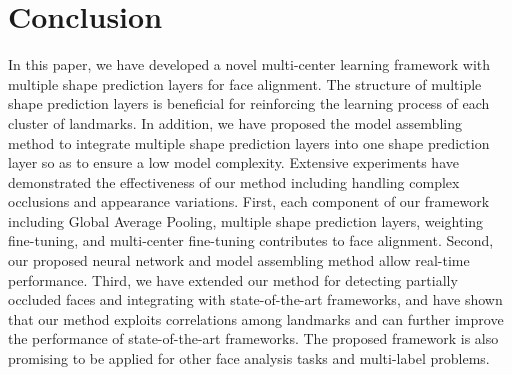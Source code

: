 \documentclass[journal]{IEEEtran}
\begin{document}
\section{Conclusion}
\label{sec:concl}

In this paper, we have developed a novel multi-center learning framework with multiple shape prediction layers for face alignment. The structure of multiple shape prediction layers is beneficial for reinforcing the learning process of each cluster of landmarks. In addition, we have proposed the model assembling method to integrate multiple shape prediction layers into one shape prediction layer so as to ensure a low model complexity. Extensive experiments have demonstrated the effectiveness of our method including handling complex occlusions and appearance variations. First, each component of our framework including Global Average Pooling, multiple shape prediction layers, weighting fine-tuning, and multi-center fine-tuning contributes to face alignment. Second, our proposed neural network and model assembling method allow real-time performance. Third, we have extended our method for detecting partially occluded faces and integrating with state-of-the-art frameworks, and have shown that our method exploits correlations among landmarks and can further improve the performance of state-of-the-art frameworks. The proposed framework is also promising to be applied for other face analysis tasks and multi-label problems.


%
\end{document}
